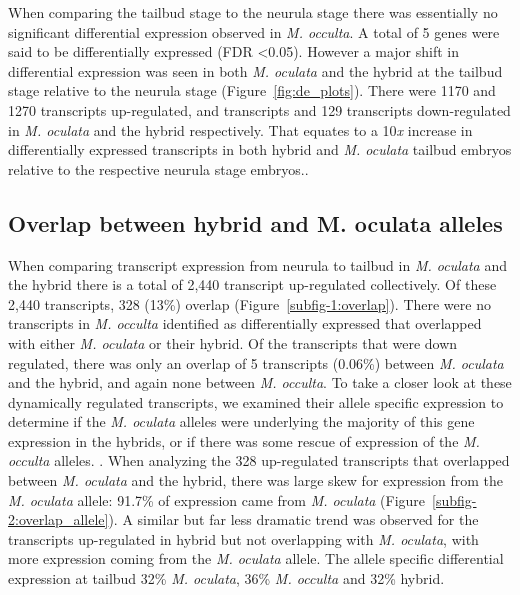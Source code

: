 When comparing the tailbud stage to the neurula stage there was essentially no significant differential expression observed in \textit{M. occulta}. A total of 5 genes were said to be differentially expressed (FDR \textless 0.05). However a major shift in differential expression was seen in both \textit{M. oculata} and the hybrid at the tailbud stage relative to the neurula stage (Figure~\ref{fig:de_plots}). There were 1170 and 1270 transcripts up-regulated, and transcripts and 129 transcripts down-regulated in \textit{M. oculata} and the hybrid respectively. That equates to a 10\textit{x} increase in differentially expressed transcripts in both hybrid and \textit{M. oculata} tailbud embryos relative to the respective neurula stage embryos..

\subsection{Overlap between hybrid and M. oculata alleles}
When comparing transcript expression from neurula to tailbud in \textit{M. oculata} and the hybrid there is a total of 2,440 transcript up-regulated collectively. Of these 2,440 transcripts, 328 (13\%) overlap (Figure~\ref{subfig-1:overlap}). There were no transcripts in \textit{M. occulta} identified as differentially expressed that overlapped with either \textit{M. oculata} or their hybrid. Of the transcripts that were down regulated, there was only an overlap of 5 transcripts (0.06\%) between \textit{M. oculata} and the hybrid, and again none between \textit{M. occulta}. To take a closer look at these dynamically regulated transcripts, we examined their allele specific expression to determine if the \textit{M. oculata} alleles were underlying the majority of this gene expression in the hybrids, or if there was some rescue of expression of the \textit{M. occulta} alleles. . When analyzing the 328 up-regulated transcripts that overlapped between \textit{M. oculata} and the hybrid, there was large skew for expression from the \textit{M. oculata} allele: 91.7\% of expression came from \textit{M. oculata} (Figure~\ref{subfig-2:overlap_allele}). A similar but far less dramatic trend was observed for the transcripts up-regulated in hybrid but not overlapping with \textit{M. oculata}, with more expression coming from the \textit{M. oculata} allele. The allele specific differential expression at tailbud 32\% \textit{M. oculata}, 36\% \textit{M. occulta} and 32\% hybrid.

